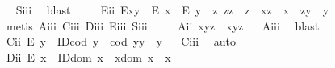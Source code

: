 \begin{isabellebody}
\isadelimproof
\ %
\endisadelimproof
%
\isatagproof
{}\isamarkupfalse%
\ S\isactrlsub i\isactrlsub i\isactrlsub i\ \isamarkupfalse%
\ blast%
\endisatagproof
{\isafoldproof}%
%
\isadelimproof
%
\endisadelimproof
\isanewline
\ \ \ \isamarkupfalse%
\ E\isactrlsub i\isactrlsub i{\isacharcolon}\ {\isachardoublequoteopen}E{\isacharparenleft}x{\isasymcdot}y{\isacharparenright}\ \isactrlbold {\isasymleftarrow}\ {\isacharparenleft}E\ x\ \isactrlbold {\isasymand}\ E\ y\ \isactrlbold {\isasymand}\ {\isacharparenleft}\isactrlbold {\isasymexists}z{\isachardot}\ z{\isasymcdot}z\ {\isasymcong}\ z\ \isactrlbold {\isasymand}\ x{\isasymcdot}z\ {\isasymcong}\ x\ \isactrlbold {\isasymand}\ z{\isasymcdot}y\ {\isasymcong}\ y{\isacharparenright}{\isacharparenright}{\isachardoublequoteclose}%
\isadelimproof
\ %
\endisadelimproof
%
\isatagproof
{}\isamarkupfalse%
\ {\isacharparenleft}metis\ A\isactrlsub i\isactrlsub i\isactrlsub i\ C\isactrlsub i\isactrlsub i\isactrlsub i\ D\isactrlsub i\isactrlsub i\isactrlsub i\ E\isactrlsub i\isactrlsub i\isactrlsub i\ S\isactrlsub i\isactrlsub i\isactrlsub i{\isacharparenright}%
\endisatagproof
{\isafoldproof}%
%
\isadelimproof
%
\endisadelimproof
\isanewline
\ \ \ \isamarkupfalse%
\ A\isactrlsub i\isactrlsub i{\isacharcolon}\ {\isachardoublequoteopen}x{\isasymcdot}{\isacharparenleft}y{\isasymcdot}z{\isacharparenright}\ {\isasymcong}\ {\isacharparenleft}x{\isasymcdot}y{\isacharparenright}{\isasymcdot}z{\isachardoublequoteclose}%
\isadelimproof
\ %
\endisadelimproof
%
\isatagproof
{}\isamarkupfalse%
\ A\isactrlsub i\isactrlsub i\isactrlsub i\ \isamarkupfalse%
\ blast%
\endisatagproof
{\isafoldproof}%
%
\isadelimproof
%
\endisadelimproof
\isanewline
\ \ \ \isamarkupfalse%
\ C\isactrlsub i\isactrlsub i{\isacharcolon}\ {\isachardoublequoteopen}E\ y\ \isactrlbold {\isasymrightarrow}\ {\isacharparenleft}ID{\isacharparenleft}cod\ y{\isacharparenright}\ \isactrlbold {\isasymand}\ {\isacharparenleft}cod\ y{\isacharparenright}{\isasymcdot}y\ {\isasymcong}\ y{\isacharparenright}{\isachardoublequoteclose}%
\isadelimproof
\ %
\endisadelimproof
%
\isatagproof
{}\isamarkupfalse%
\ C\isactrlsub i\isactrlsub i\isactrlsub i\ \isamarkupfalse%
\ auto%
\endisatagproof
{\isafoldproof}%
%
\isadelimproof
%
\endisadelimproof
\isanewline
\ \ \ \isamarkupfalse%
\ D\isactrlsub i\isactrlsub i{\isacharcolon}\ {\isachardoublequoteopen}E\ x\ \isactrlbold {\isasymrightarrow}\ {\isacharparenleft}ID{\isacharparenleft}dom\ x{\isacharparenright}\ \isactrlbold {\isasymand}\ x{\isasymcdot}{\isacharparenleft}dom\ x{\isacharparenright}\ {\isasymcong}\ x{\isacharparenright}{\isachardoublequoteclose}%

\end{isabellebody}
